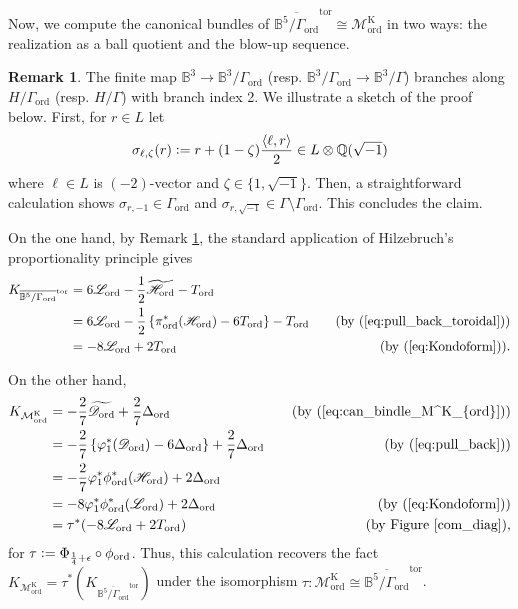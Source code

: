 \documentclass[12pt, pdftex]{amsart}
\theoremstyle{plain}
\theoremstyle{definition}
\newtheorem{rem}[thm]{Remark}
\numberwithin{equation}{section}
\def\Q{{\mathbb Q}}
\def\B{{\mathbb B}}
\def\ord{\mathrm{ord}}
\def\K{\mathrm{K}}
\def\tor{\mathrm{tor}}
\def\L{\mathscr{L}}
\def\H{\mathscr{H}}
\def\M{\mathcal{M}}
\def\D{\mathscr{D}}
\def\l{\langle}
\def\r{\rangle}
\newcommand{\defeq}{\vcentcolon=}
\begin{document}
Now, we compute the canonical bundles of $\overline{\B^5/\Gamma_{\ord}}^{\tor}\cong \M^{\K}_{\ord}$ in two ways: the realization as a ball quotient and the blow-up sequence.
\begin{rem}
\label{rem:ram}
The finite map $\B^3\to\B^3/\Gamma_{\ord}$ (resp. $\B^3/\Gamma_{\ord}\to\B^3/\Gamma$) branches along $H/\Gamma_{\ord}$ (resp. $H/\Gamma$) with branch index 2.
We illustrate a sketch of the proof below.
First, for $r\in L$ let 
\[\sigma_{\ell,\zeta}(r)\defeq r+(1-\zeta)\frac{\l\ell, r\r}{2}\in L\otimes\Q(\sqrt{-1})\]
where $\ell\in L$ is $(-2)$-vector and $\zeta\in\{1,\sqrt{-1}\}$. 
Then, a straightforward calculation shows $\sigma_{r,-1}\in\Gamma_{\ord}$ and $\sigma_{r,\sqrt{-1}}\in\Gamma\setminus\Gamma_{\ord}$.
This concludes the claim.
\end{rem}
On the one hand, 
by Remark \ref{rem:ram}, the standard application of Hilzebruch's proportionality principle gives
\begin{alignat*}{2}
    K_{\overline{\B^5/\Gamma_{\ord}}^{\tor}}&=6\L_{\ord}-\frac{1}{2}\widetilde{\H_{\ord}}-T_{\ord}\\
        &=6\L_{\ord}-\frac{1}{2}\left\{\pi_{\ord}^{*}(\H_{\ord})-6T_{\ord}\right\}-T_{\ord}&\quad (\mathrm{by}\ (\ref{eq:pull_back_toroidal}))\\
    &=-8\L_{\ord}+2T_{\ord}&\quad (\mathrm{by}\ (\ref{eq:Kondoform})).
\end{alignat*}




On the other hand, 
\begin{alignat*}{2}
   K_{\M^{\K}_{\ord}}
    &=-\frac{2}{7}\widetilde{\D_{\ord}}+\frac{2}{7}\Delta_{\ord}\quad&(\mathrm{by}\ (\ref{eq:can_bindle_M^K_{ord}}))\\
    &=-\frac{2}{7}\left\{\varphi_1^{*}(\D_{\ord})-6\Delta_{\ord}\right\}+\frac{2}{7}\Delta_{\ord}\quad&(\mathrm{by}\ (\ref{eq:pull_back}))\\
    &=-\frac{2}{7}\varphi_1^{*}\phi_{\ord}^{*}(\H_{\ord})+2\Delta_{\ord}\\
    &=-8\varphi_1^{*}\phi_{\ord}^{*}(\L_{\ord})+2\Delta_{\ord}\quad& (\mathrm{by}\ (\ref{eq:Kondoform}))\\
    &=\tau^{*}(-8\L_{\ord}+2T_{\ord})\quad &(\mathrm{by\ Figure}\ \ref{com_diag}),
\end{alignat*}
for $\tau\defeq\Phi_{\frac{1}{4}+\epsilon}\circ\phi_{\ord}$.
Thus, this calculation recovers the fact $K_{\M^{\K}_{\ord}}=\tau^{*}(K_{\overline{\B^5/\Gamma_{\ord}}^{\tor}})$ under the isomorphism $\tau:\M^{\K}_{\ord}\cong\overline{\B^5/\Gamma_{\ord}}^{\tor}$.
\end{document}
